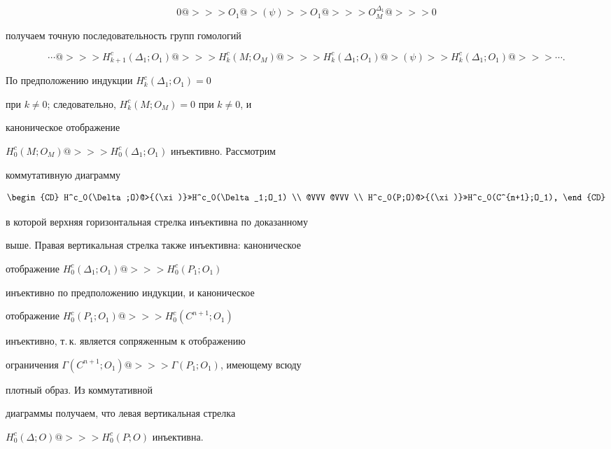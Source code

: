 \begin{pf}
$$ 


0@>>> O_1@>{(\psi)}>>O_1@>>>O^{\Delta_1}_M@>>>0 


$$ 


получаем точную последовательность групп гомологий 


$$ 


\dotsb@>>>H^c_{k+1}(\Delta_1;O_1)@>>>H^c_k(M;O_M)@>>> 


H^c_k(\Delta_1;O_1)@>{(\psi)}>>H^c_k(\Delta_1;O_1)@>>>\dotsb. 


$$ 


По предположению индукции $H^c_k(\Delta_1;O_1)=0$ 


при $k\ne 0$; следовательно, $H^c_k(M;O_M)=0$ при $k\ne 0$, и 


каноническое отображение 


$H^c_0(M;O_M)@>>>H^c_0(\Delta_1;O_1)$ инъективно. Рассмотрим 


коммутативную диаграмму 


$$ 


\begin{CD} 


H^c_0(\Delta;O)@>{(\xi)}>>H^c_0(\Delta_1;O_1) \\ 


@VVV @VVV \\ 


H^c_0(P;O)@>{(\xi)}>>H^c_0(C^{n+1};O_1), 


\end{CD} 


$$ 


в которой верхняя горизонтальная стрелка инъективна по доказанному 


выше. Правая вертикальная стрелка также инъективна: каноническое 


отображение $H^c_0(\Delta_1;O_1)@>>>H^c_0(P_1;O_1)$ 


инъективно по предположению индукции, и каноническое 


отображение $H^c_0(P_1;O_1)@>>>H^c_0(C^{n+1};O_1)$ 


инъективно, т.\,к.{} является сопряженным к отображению 


ограничения $\Gamma(C^{n+1};O_1)@>>>\Gamma(P_1;O_1)$, имеющему всюду 


плотный образ. Из коммутативной 


диаграммы получаем, что левая вертикальная стрелка 


$H^c_0(\Delta;O)@>>>H^c_0(P;O)$ инъективна. 


\end{pf} 


